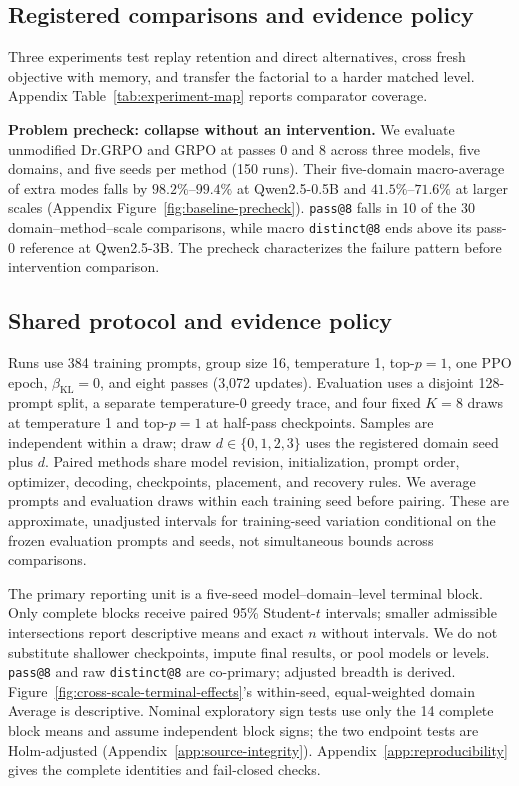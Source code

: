 \subsection{Registered comparisons and evidence policy}
\label{app:comparison-design}

Three experiments test replay retention and direct alternatives, cross
fresh objective with memory, and transfer the factorial to a harder matched
level. Appendix Table~\ref{tab:experiment-map} reports comparator coverage.

\noindent\textbf{Problem precheck: collapse without an intervention.}
We evaluate unmodified Dr.GRPO and GRPO at passes 0 and 8 across three
models, five domains, and five seeds per method (150 runs). Their
five-domain macro-average of extra modes falls by \(98.2\%\)--\(99.4\%\)
at Qwen2.5-0.5B and \(41.5\%\)--\(71.6\%\) at larger scales
(Appendix Figure~\ref{fig:baseline-precheck}). \texttt{pass@8} falls in 10 of
the 30 domain--method--scale comparisons, while macro \texttt{distinct@8} ends
above its pass-0 reference at Qwen2.5-3B. The
precheck characterizes the failure pattern before intervention comparison.


\subsection{Shared protocol and evidence policy}
\label{sec:shared-protocol}

Runs use 384 training
prompts, group size 16, temperature 1, top-\(p=1\), one PPO epoch,
\(\beta_{\mathrm{KL}}=0\), and eight passes (3,072 updates). Evaluation uses a
disjoint 128-prompt split, a separate temperature-0 greedy trace, and four
fixed \(K=8\) draws at temperature 1 and top-\(p=1\) at half-pass checkpoints.
Samples are independent within a draw; draw \(d\in\{0,1,2,3\}\) uses the
registered domain seed plus \(d\). Paired methods share model revision,
initialization, prompt order, optimizer, decoding, checkpoints, placement, and
recovery rules.
We average prompts and evaluation draws within each training seed before pairing. These are approximate, unadjusted intervals for training-seed variation conditional on the frozen evaluation prompts and seeds, not simultaneous bounds across comparisons.

The primary reporting unit is a five-seed model--domain--level terminal block. Only
complete blocks receive paired 95\% Student-\(t\) intervals; smaller admissible
intersections report descriptive means and exact \(n\) without intervals. We do not substitute
shallower checkpoints, impute final results, or pool models or levels.
\texttt{pass@8} and raw \texttt{distinct@8} are co-primary; adjusted breadth is
derived. Figure~\ref{fig:cross-scale-terminal-effects}'s within-seed,
equal-weighted domain Average is descriptive. Nominal exploratory sign tests use only the
14 complete block means and assume independent block signs; the two endpoint
tests are Holm-adjusted (Appendix~\ref{app:source-integrity}).
Appendix~\ref{app:reproducibility} gives the complete identities and fail-closed
checks.

